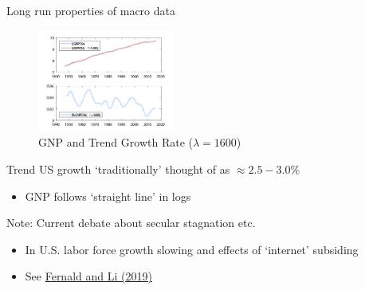 \begin{frame}{Long run properties of macro data}

\begin{figure}
\caption[HP Trend Growth Rate]{GNP and Trend Growth Rate ($\lambda=1600$)}
\centering
\label{fig:gnp_hp_trend}
\includegraphics[width=0.40\textwidth]{Figures/gnp_hp_trend.JPG}
\end{figure}

Trend US growth `traditionally' thought of as $\approx 2.5-3.0\%$
	\begin{itemize}
	\item	GNP follows `straight line' in logs
	\end{itemize}
Note: Current debate about secular stagnation etc.
	\begin{itemize}
	\item	In U.S. labor force growth slowing and effects of `internet' subsiding
	\item	See \href{https://www.frbsf.org/economic-research/publications/economic-letter/2019/june/is-slow-still-new-normal-for-GDP-growth/}{Fernald and Li (2019)}
	\end{itemize}

\end{frame}


